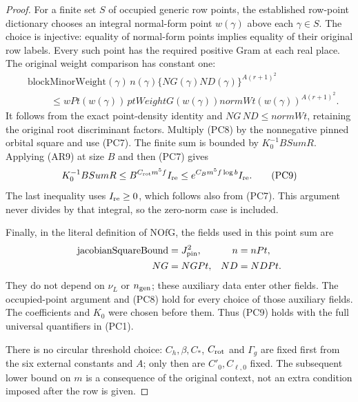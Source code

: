 \begin{proof}
For a finite set \(S\) of occupied generic row points,
the established row-point dictionary chooses an integral
normal-form point \(w(\gamma)\) above each \(\gamma\in S\).
The choice is injective: equality of normal-form points
implies equality of their original row labels. Every such
point has the required positive Gram at each real place.
The original weight comparison has constant one:
\[
\begin{split}
 &\mathrm{blockMinorWeight}(\gamma)\,n(\gamma)
       \{NG(\gamma)ND(\gamma)\}^{A(r+1)^2}\\
 &\hspace{1cm}\le
 wPt(w(\gamma))\,ptWeightG(w(\gamma))
                  normWt(w(\gamma))^{A(r+1)^2}.
\end{split}                                           \tag{PC8}
\]
It follows from the exact point-density identity and
\(NG\,ND\le normWt\), retaining the original root
discriminant factors. Multiply (PC8) by the nonnegative
pinned orbital square and use (PC7). The finite sum is
bounded by \(K_0^{-1}BSumR\). Applying (AR9) at size \(B\)
and then (PC7) gives
\[
 K_0^{-1}BSumR
 \le B^{C_{\rm rot}m^5f}I_{\rm re}
 \le e^{C_Bm^5f\log b}I_{\rm re}.
                                                        \tag{PC9}
\]
The last inequality uses \(I_{\rm re}\ge0\), which follows
also from (PC7). This argument never divides by that integral,
so the zero-norm case is included.

Finally, in the literal definition of \(\mathrm{NOfG}\),
the fields used in this point sum are
\[
\begin{aligned}
 \mathrm{jacobianSquareBound}&=J_{\rm pin}^2,
       & n&=nPt,\\
 NG&=NGPt, & ND&=NDPt.
\end{aligned}
\]
They do not depend on
\(\nu_L\) or \(n_{\rm gen}\); these auxiliary data enter
other fields. The occupied-point argument and (PC8) hold
for every choice of those auxiliary fields. The coefficients
and \(K_0\) were chosen before them. Thus (PC9) holds with
the full universal quantifiers in (PC1).

There is no circular threshold choice: \(C_h,\beta,C_*\),
\(C_{\rm rot}\) and \(\Gamma_g\) are fixed first from the
six external constants and \(A\); only then are
\(C'_0,C_{\ell,0}\) fixed. The subsequent lower bound on
\(m\) is a consequence of the original context, not an
extra condition imposed after the row is given.
\end{proof}
